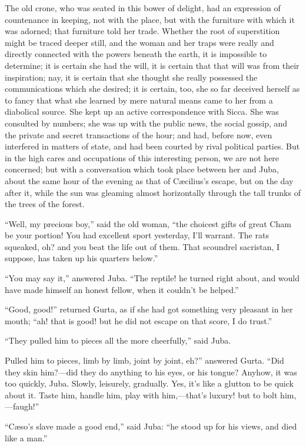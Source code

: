 The old crone, who was seated in this bower of delight, had an
expression of countenance in keeping, not with the place, but with the
furniture with which it was adorned; that furniture told her trade.
Whether the root of superstition might be traced deeper still, and the
woman and her traps were really and directly connected with the powers
beneath the earth, it is impossible to determine; it is certain she
had the will, it is certain that that will was from their inspiration;
nay, it is certain that she thought she really possessed the
communications which she desired; it is certain, too, she so far
deceived herself as to fancy that what she learned by mere natural
means came to her from a diabolical source. She kept up an active
correspondence with Sicca. She was consulted by numbers; she was up
with the public news, the social gossip, and the private and secret
transactions of the hour; and had, before now, even interfered in
matters of state, and had been courted by rival political parties. But
in the high cares and occupations of this interesting person, we are
not here concerned; but with a conversation which took place between
her and Juba, about the same hour of the evening as that of Cæcilius's
escape, but on the day after it, while the sun was gleaming almost
horizontally through the tall trunks of the trees of the forest.

``Well, my precious boy,'' said the old woman, ``the choicest gifts of great Cham be your portion! You had
excellent sport yesterday, I'll warrant. The rats squeaked, oh? and
you beat the life out of them. That scoundrel sacristan, I suppose,
has taken up his quarters below.''

``You may say it,'' answered Juba. ``The reptile! he
turned right about, and would have made himself an honest fellow, when
it couldn't be helped.''

``Good, good!'' returned Gurta, as if she had got something
very pleasant in her mouth; ``ah! that is good! but he did not
escape on that score, I do trust.''

``They pulled him to pieces all the more cheerfully,'' said
Juba.

Pulled him to pieces, limb by limb, joint by joint, eh?''
answered Gurta. ``Did they skin him?—did they do anything to his
eyes, or his tongue? Anyhow, it was too quickly, Juba. Slowly,
leisurely, gradually. Yes, it's like a glutton to be quick about it.
Taste him, handle him, play with him,—that's luxury! but to bolt
him,—faugh!''

``Cæso's slave made a good end,'' said Juba: ``he
stood up for his views, and died like a man.''


